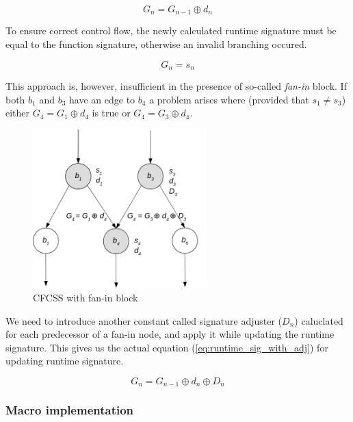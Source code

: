 \begin{equation}
\label{eq:runtime_sig}
G_n = G_{n-1} \oplus d_n
\end{equation}

To ensure correct control flow, the newly calculated runtime signature must be equal to the function signature, otherwise an invalid branching occured.

\begin{equation}
\label{eq:sig_check}
G_n = s_n
\end{equation}

This approach is, however, insufficient in the presence of so-called \textit{fan-in} block. If both {$b_1$} and {$b_3$} have an edge to {$b_4$} a problem arises where (provided that {$s_1 \ne s_3$}) either {$G_4 = G_1 \oplus d_4$} is true or {$G_4 = G_3 \oplus d_4$}.

\begin{figure}[!h]
    \centering
    \includegraphics[width=0.6\textwidth]{diagrams/cfcss/adjuster.png}
    \caption{CFCSS with fan-in block \cite{coast:cfcss}}
\end{figure}

We need to introduce another constant called signature adjuster ({$D_n$}) caluclated for each predecessor of a fan-in node, and apply it while updating the runtime signature. This gives us the actual equation (\ref{eq:runtime_sig_with_adj}) for updating runtime signature.

\begin{equation}
\label{eq:runtime_sig_with_adj}
G_n = G_{n-1} \oplus d_n \oplus D_n
\end{equation}

\subsubsection{Macro implementation}

